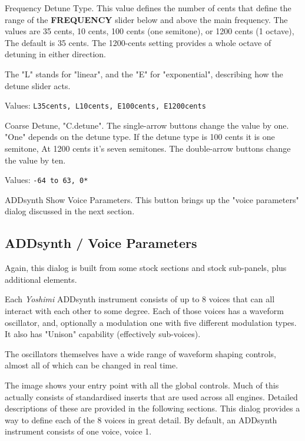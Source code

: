    Frequency Detune Type.
   This value defines the number of cents that define the range of the
   \textbf{FREQUENCY} slider below and above the main frequency.
   The values are 35 cents, 10 cents, 100 cents (one semitone), or
   1200 cents (1 octave),  The default is 35 cents.  The 1200-cents
   setting provides a whole octave of detuning in either direction.

   The "L" stands for "linear", and the "E" for "exponential", describing
   how the detune slider acts.

   Values: \texttt{L35cents, L10cents, E100cents, E1200cents}

   Coarse Detune, "C.detune".
   The single-arrow buttons change the value by one.
   "One" depends on the detune type.
   If the detune type is 100 cents it is one semitone,
   At 1200 cents it's seven semitones.
   The double-arrow buttons change the value by ten.

   Values: \texttt{-64 to 63, 0*}

   ADDsynth Show Voice Parameters.
   This button brings up the "voice parameters" dialog discussed in the next
   section.

\subsection{ADDsynth / Voice Parameters}
\label{subsec:addsynth_voice_parameters}

   Again, this dialog is built from some stock sections and stock
   sub-panels, plus additional elements.

   Each \textsl{Yoshimi} ADDsynth instrument consists of up to 8 voices
   that can all interact with each other to some degree. Each of those voices
   has a waveform oscillator, and, optionally a modulation one with five
   different modulation types. It also has "Unison" capability (effectively
   sub-voices).

   The oscillators themselves have a wide range of waveform shaping controls,
   almost all of which can be changed in real time.

    The image shows your entry point with all the global controls. Much of this
    actually consists of standardised inserts that are used across all engines.
    Detailed descriptions of these are provided in the following sections.
    This dialog provides a way to define each of the 8 voices in great detail.
    By default, an ADDsynth instrument consists of one voice, voice 1.


